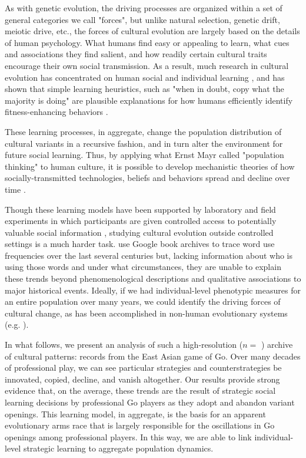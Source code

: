 \documentclass[reqno,12pt]{amsart}
\begin{document}
As with genetic evolution, the driving processes are organized within a set of general categories we call "forces", but unlike natural selection, genetic drift, meiotic drive, etc., the forces of cultural evolution are largely based on the details of human psychology. What humans find easy or appealing to learn, what cues and associations they find salient, and how readily certain cultural traits encourage their own social transmission. As a result, much research in cultural evolution has concentrated on human social and individual learning \citep{mesoudi2006unified}, and has shown that simple learning heuristics, such as "when in doubt, copy what the majority is doing" are plausible explanations for how humans efficiently identify fitness-enhancing behaviors \citep{mcelreath2008successbias}.

These learning processes, in aggregate, change the population distribution of cultural variants in a recursive fashion, and in turn alter the environment for future social learning. Thus, by applying what Ernst Mayr called "population thinking" to human culture, it is possible to develop mechanistic theories of how socially-transmitted technologies, beliefs and behaviors spread and decline over time \citep{shennan2009pattern}.

Though these learning models have been supported by laboratory and field experiments in which participants are given controlled access to potentially valuable social information \citep{baum2004cultural, caldwell2008studying, efferson2007equality, mesoudi2011payoffbias}, studying cultural evolution outside controlled settings is a much harder task. \citet{michel2011quantitative} use Google book archives to trace word use frequencies over the last several centuries but, lacking information about who is using those words and under what circumstances, they are unable to explain these trends beyond phenomenological descriptions and qualitative associations to major historical events. Ideally, if we had individual-level phenotypic measures for an entire population over many years, we could identify the driving forces of cultural change, as has been accomplished in non-human evolutionary systems (e.g. \citet{grant2002unpredictable, ozgul2009dynamics}).

In what follows, we present an analysis of such a high-resolution ($n=$ \nGames) archive of cultural patterns: records from the East Asian game of Go. Over many decades of professional play, we can see particular strategies and counterstrategies be innovated, copied, decline, and vanish altogether. Our results provide strong evidence that, on the average, these trends are the result of strategic social learning decisions by professional Go players as they adopt and abandon variant openings. This learning model, in aggregate, is the basis for an apparent evolutionary arms race that is largely responsible for the oscillations in Go openings among professional players. In this way, we are able to link individual-level strategic learning to aggregate population dynamics.
\end{document}
